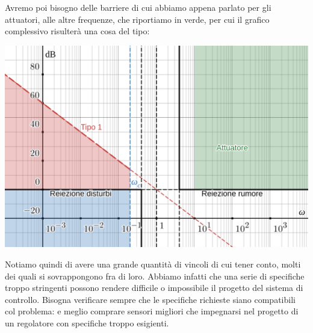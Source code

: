 \documentclass[a4paper,11pt]{article}
\begin{document}
\noindent
\begin{minipage}{\textwidth}

Avremo poi bisogno delle barriere di cui abbiamo appena parlato per gli attuatori, alle altre frequenze, che riportiamo in verde, per cui il grafico complessivo risulterà una cosa del tipo:
\begin{center}
	\includegraphics[scale=0.28]{../figures/crociera_full_regions.png}
\end{center}

\end{minipage}

Notiamo quindi di avere una grande quantità di vincoli di cui tener conto, molti dei quali si sovrappongono fra di loro.
Abbiamo infatti che una serie di specifiche troppo stringenti possono rendere difficile o impossibile il progetto del sistema di controllo.
Bisogna verificare sempre che le specifiche richieste siano compatibili col problema: e meglio comprare sensori migliori che impegnarsi nel progetto di un regolatore con specifiche troppo esigienti.
\end{document}
